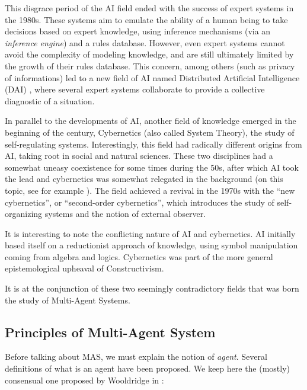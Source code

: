 This disgrace period of the AI field ended with the success of expert systems in the 1980s. These systems aim to emulate the ability of a human being to take decisions based on expert knowledge, using inference mechanisms (via an \emph{inference engine}) and a rules database.
However, even expert systems cannot avoid the complexity of modeling knowledge, and are still ultimately limited by the growth of their rules database. This concern, among others (such as privacy of informations) led to a new field of AI named Distributed Artificial Intelligence (DAI) \cite{o1996foundations}, where several expert systems collaborate to provide a collective diagnostic of a situation.

In parallel to the developments of AI, another field of knowledge emerged in the beginning of the century, Cybernetics (also called System Theory), the study of self-regulating systems. Interestingly, this field had radically different origins from AI, taking root in social and natural sciences. These two disciplines had a somewhat uneasy coexistence for some times during the 50s, after which AI took the lead and cybernetics was somewhat relegated in the background (on this topic, see for example \cite{5/2/086.cariani}). The field achieved a revival in the 1970s with the \enquote{new cybernetics}, or \enquote{second-order cybernetics}, which introduces the study of self-organizing systems and the notion of external observer.

It is interesting to note the conflicting nature of AI and cybernetics. AI initially based itself on a reductionist approach of knowledge, using symbol manipulation coming from algebra and logics. Cybernetics was part of the more general epistemological upheaval of Constructivism.

It is at the conjunction of these two seemingly contradictory fields that was born the study of Multi-Agent Systems.

\subsection{Principles of Multi-Agent System}

Before talking about MAS, we must explain the notion of \emph{agent}. Several definitions of what is an agent have been proposed. We keep here the (mostly) consensual one proposed by Wooldridge in \cite{wei1999mutiagent}:


